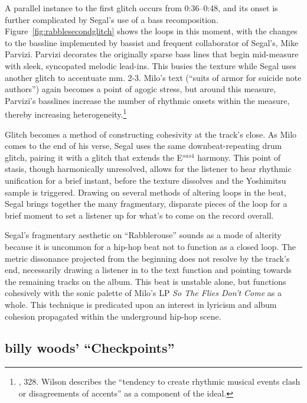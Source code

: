 A parallel instance to the first glitch occurs from 0:36--0:48, and its onset is further complicated
by Segal's use of a bass recomposition. Figure~\ref{fig:rabblesecondglitch} shows the loops in this 
moment, with the changes to the bassline implemented by bassist and frequent collaborator of Segal's, 
Mike Parvizi. Parvizi decorates the originally sparse bass lines that begin mid-measure with sleek,
syncopated melodic lead-ins. This busies the texture while Segal uses another glitch to accentuate
mm. 2-3. Milo's text (``suits of armor for suicide note authors'') again becomes a point of agogic 
stress, but around this measure, Parvizi's basslines increase the number of rhythmic onsets within 
the measure, thereby increasing heterogeneity.\footnote{
    \cite{ollywilsonHeterogeneousSoundIdeal1992}, 328. Wilson describes the ``tendency to create 
    rhythmic musical events clash or disagreements of accents'' as a component of the ideal.}

Glitch becomes a method of constructing cohesivity at the track's close. As Milo comes to the end
of his verse, Segal uses the same downbeat-repeating drum glitch, pairing it with a glitch that 
extends the E$^{sus4}$ harmony. This point of stasis, though harmonically unresolved, allows
for the listener to hear rhythmic unification for a brief instant, before the texture dissolves and
the Yoshimitsu sample is triggered. Drawing on several methods of altering loops in the beat, Segal
brings together the many fragmentary, disparate pieces of the loop for a brief moment to set a 
listener up for what's to come on the record overall.

Segal's fragmentary aesthetic on ``Rabblerouse'' sounds as a mode of alterity because it is uncommon
for a hip-hop beat not to function as a closed loop. The metric dissonance projected from the 
beginning does not resolve by the track's end, necessarily drawing a listener in to the text function
and pointing  towards the remaining tracks on the album. This beat is unstable alone, but functions 
cohesively with the sonic palette of Milo's LP \textit{So The Flies Don't Come} as a whole. This 
technique is predicated  upon an interest in lyricism and album cohesion propagated within the
underground hip-hop scene.

\subsection*{\centering billy woods' ``Checkpoints''}

